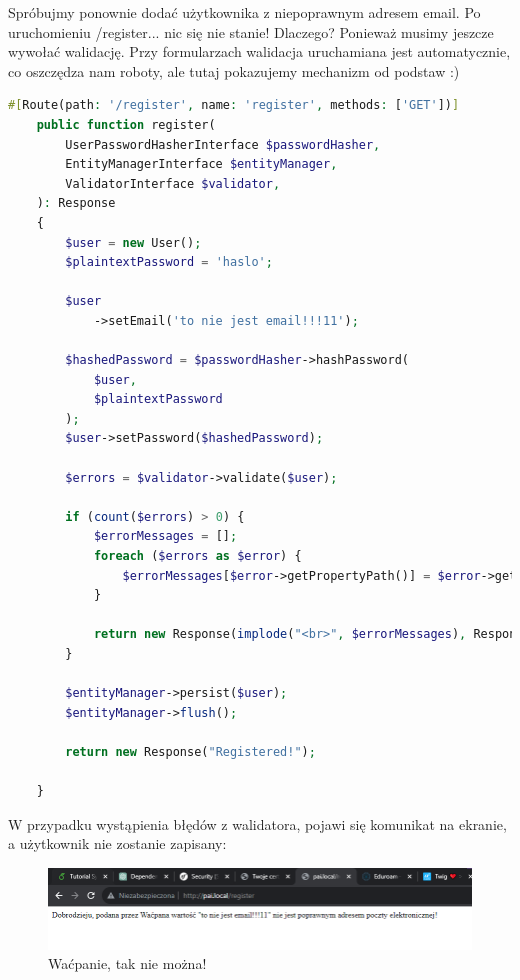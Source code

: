 \documentclass[polish, a4paper]{article}
\begin{document}
Spróbujmy ponownie dodać użytkownika z niepoprawnym adresem email. Po uruchomieniu /register... nic się nie stanie! Dlaczego? Ponieważ musimy jeszcze wywołać walidację. Przy formularzach walidacja uruchamiana jest automatycznie, co oszczędza nam roboty, ale tutaj pokazujemy mechanizm od podstaw :)

\begin{lstlisting}[language=PHP, caption=Controller/IndexController.php]
    #[Route(path: '/register', name: 'register', methods: ['GET'])]
    public function register(
        UserPasswordHasherInterface $passwordHasher,
        EntityManagerInterface $entityManager,
        ValidatorInterface $validator,
    ): Response
    {
        $user = new User();
        $plaintextPassword = 'haslo';

        $user
            ->setEmail('to nie jest email!!!11');

        $hashedPassword = $passwordHasher->hashPassword(
            $user,
            $plaintextPassword
        );
        $user->setPassword($hashedPassword);

        $errors = $validator->validate($user);

        if (count($errors) > 0) {
            $errorMessages = [];
            foreach ($errors as $error) {
                $errorMessages[$error->getPropertyPath()] = $error->getMessage();
            }

            return new Response(implode("<br>", $errorMessages), Response::HTTP_BAD_REQUEST);
        }

        $entityManager->persist($user);
        $entityManager->flush();

        return new Response("Registered!");

    }
\end{lstlisting} 

W przypadku wystąpienia błędów z walidatora, pojawi się komunikat na ekranie, a użytkownik nie zostanie zapisany:


\begin{figure}[H]
  \centering
  \includegraphics[width=\textwidth]{wacpan.png}
  \caption{Waćpanie, tak nie można!}
\end{figure}
\end{document}
